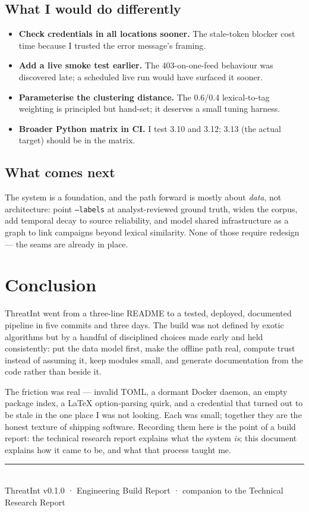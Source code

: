 \documentclass[11pt,a4paper]{article}
\newcommand{\code}[1]{\texttt{\small #1}}
\begin{document}
\subsection{What I would do differently}
\begin{itemize}[leftmargin=1.4em,itemsep=3pt]
  \item \textbf{Check credentials in all locations sooner.} The stale-token
    blocker cost time because I trusted the error message's framing.
  \item \textbf{Add a live smoke test earlier.} The 403-on-one-feed behaviour
    was discovered late; a scheduled live run would have surfaced it sooner.
  \item \textbf{Parameterise the clustering distance.} The 0.6/0.4 lexical-to-tag
    weighting is principled but hand-set; it deserves a small tuning harness.
  \item \textbf{Broader Python matrix in CI.} I test 3.10 and 3.12; 3.13 (the
    actual target) should be in the matrix.
\end{itemize}

\subsection{What comes next}
The system is a foundation, and the path forward is mostly about \emph{data}, not
architecture: point \code{--labels} at analyst-reviewed ground truth, widen the
corpus, add temporal decay to source reliability, and model shared
infrastructure as a graph to link campaigns beyond lexical similarity. None of
those require redesign --- the seams are already in place.

\section{Conclusion}

ThreatInt went from a three-line README to a tested, deployed, documented
pipeline in five commits and three days. The build was not defined by exotic
algorithms but by a handful of disciplined choices made early and held
consistently: put the data model first, make the offline path real, compute trust
instead of assuming it, keep modules small, and generate documentation from the
code rather than beside it.

The friction was real --- invalid TOML, a dormant Docker daemon, an empty
package index, a LaTeX option-parsing quirk, and a credential that turned out to
be stale in the one place I was not looking. Each was small; together they are
the honest texture of shipping software. Recording them here is the point of a
build report: the technical research report explains what the system \emph{is};
this document explains how it came to be, and what that process taught me.

\vspace{0.5cm}
\begin{center}
\rule{8cm}{0.4pt}\\[0.25cm]
{\footnotesize\color{grey}
ThreatInt v0.1.0 · Engineering Build Report · companion to the Technical
Research Report}
\end{center}
\end{document}
